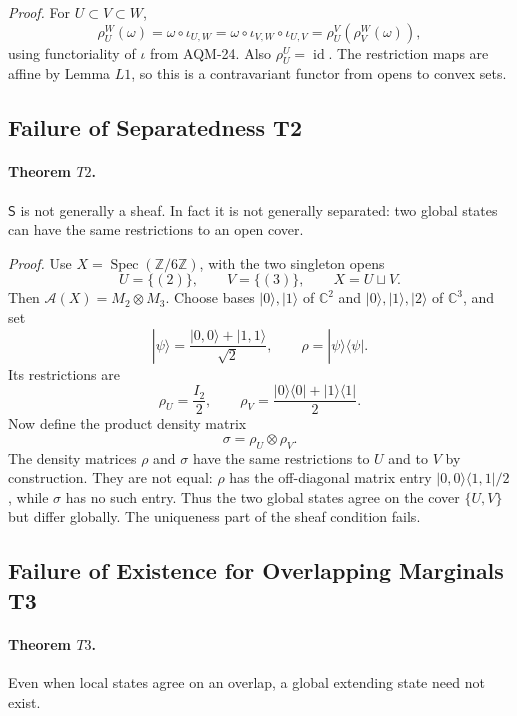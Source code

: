 \emph{Proof.}
For \(U\subset V\subset W\),
\[
  \rho^W_U(\omega)
  =
  \omega\circ\iota_{U,W}
  =
  \omega\circ\iota_{V,W}\circ\iota_{U,V}
  =
  \rho^V_U(\rho^W_V(\omega)),
\]
using functoriality of \(\iota\) from AQM-24.  Also
\(\rho^U_U=\operatorname{id}\).  The restriction maps are affine by Lemma
\(L1\), so this is a contravariant functor from opens to convex sets.

\subsection{Failure of Separatedness T2}

\paragraph{Theorem \(T2\).}
\(\mathsf S\) is not generally a sheaf.  In fact it is not generally
separated: two global states can have the same restrictions to an open cover.

\emph{Proof.}
Use \(X=\operatorname{Spec}(\mathbb Z/6\mathbb Z)\), with the two singleton
opens
\[
  U=\{(2)\},\qquad V=\{(3)\},\qquad X=U\sqcup V.
\]
Then \(\mathcal A(X)=M_2\otimes M_3\).  Choose bases
\(|0\rangle,|1\rangle\) of \(\mathbb C^2\) and
\(|0\rangle,|1\rangle,|2\rangle\) of \(\mathbb C^3\), and set
\[
  |\psi\rangle=\frac{|0,0\rangle+|1,1\rangle}{\sqrt2},
  \qquad
  \rho=|\psi\rangle\langle\psi|.
\]
Its restrictions are
\[
  \rho_U=\frac{I_2}{2},\qquad
  \rho_V=\frac{|0\rangle\langle0|+|1\rangle\langle1|}{2}.
\]
Now define the product density matrix
\[
  \sigma=\rho_U\otimes\rho_V.
\]
The density matrices \(\rho\) and \(\sigma\) have the same restrictions to
\(U\) and to \(V\) by construction.  They are not equal: \(\rho\) has the
off-diagonal matrix entry \(|0,0\rangle\langle1,1|/2\), while \(\sigma\) has
no such entry.  Thus the two global states agree on the cover
\(\{U,V\}\) but differ globally.  The uniqueness part of the sheaf condition
fails.

\subsection{Failure of Existence for Overlapping Marginals T3}

\paragraph{Theorem \(T3\).}
Even when local states agree on an overlap, a global extending state need not
exist.


